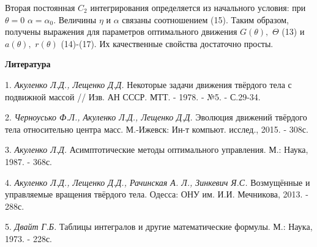 Вторая постоянная $ C_2 $ интегрирования определяется из начального условия: при $ \theta=0$ $\alpha=\alpha_0 $. Величины $ \eta $ и $ \alpha $ связаны соотношением (15). Таким образом, получены выражения для параметров оптимального движения $ G(\theta),\,\,\Theta $ (13) и $ a(\theta),\,\,r(\theta) $ (14)-(17). Их качественные свойства достаточно просты.



\smallskip \centerline{\bf Литература}\nopagebreak

1. {\it Акуленко Л.Д., Лещенко Д.Д.} Некоторые задачи движения твёрдого тела с подвижной массой // Изв. АН СССР. МТТ. - 1978. - №5. - С.29-34.

2. {\it Черноусько Ф.Л., Акуленко Л.Д., Лещенко Д.Д.} Эволюция движений твёрдого тела относительно центра масс. М.-Ижевск: Ин-т компьют. исслед., 2015. - 308с.

3. {\it Акуленко Л.Д.} Асимптотические методы оптимального управления. М.: Наука, 1987. - 368с.

4. {\it Акуленко Л.Д., Лещенко Д.Д., Рачинская А. Л., Зинкевич Я.С.} Возмущённые и управляемые вращения твёрдого тела. Одесса: ОНУ им. И.И. Мечникова, 2013. - 288с.

5. {\it Двайт Г.Б.} Таблицы интегралов и другие математические формулы. М.: Наука, 1973. - 228с.

